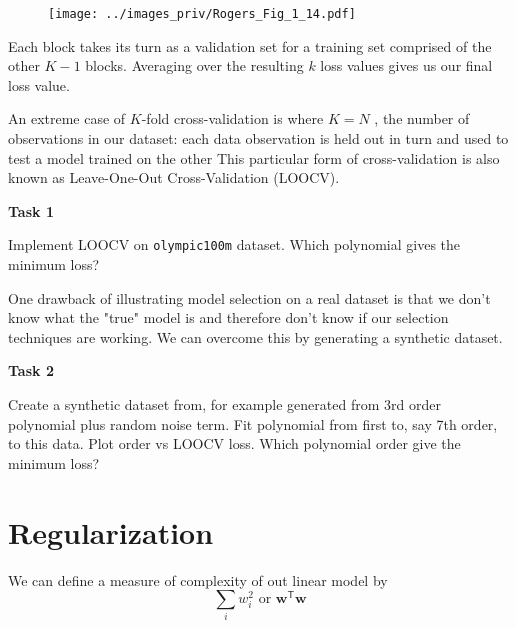 \documentclass[b5paper,12pt]{article} %
\newcommand{\txtinline}[1]{\texttt{#1}}
\begin{document}
\begin{figure}[H]
\begin{center}
\texttt{[image: ../images\_priv/Rogers\_Fig\_1\_14.pdf]}
\end{center}
\end{figure}

Each block takes its turn as a
validation set for a training set comprised of the other $K-1$ blocks. Averaging over
the resulting $k$ loss values gives us our final loss value.

An extreme case of $K$-fold
cross-validation is where $K = N$ , the number of observations in our dataset: each
data observation is held out in turn and used to test a model trained on the other
This particular form of cross-validation is also known as Leave-One-Out
Cross-Validation (LOOCV).

\begin{mdframed}
\textbf{Task 1}

Implement LOOCV on \txtinline{olympic100m} dataset. Which polynomial gives the
minimum loss?
\end{mdframed}

One drawback of illustrating model selection on a real dataset is that we don’t
know what the "true" model is and therefore don’t know if our selection techniques
are working. We can overcome this by generating a synthetic dataset.

\begin{mdframed}
\textbf{Task 2}

Create a synthetic dataset from, for example generated from 3rd order
polynomial plus random noise term. Fit polynomial from first to, say 7th order,
to this data. Plot order vs LOOCV loss. Which polynomial order give the minimum loss?
\end{mdframed}



\section{Regularization}

We can define a measure of complexity of out linear model by
\begin{equation}
\sum_{i} w_{i}^{2}\,\,\text{or }\mathbf{w}^{\mathsf{T}}\mathbf{w}
\end{equation}
\end{document}
